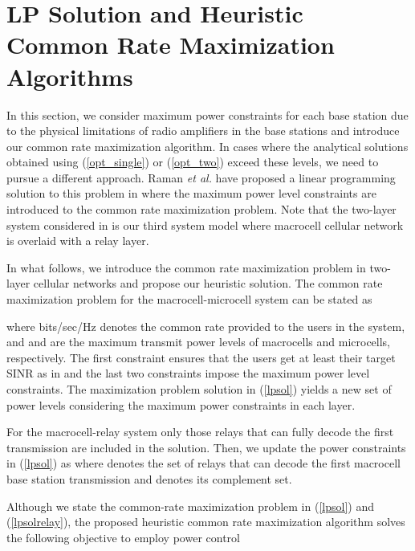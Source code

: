 \documentclass[conference,letterpaper,final,10pt]{IEEEtran}
\begin{document}
\section{LP Solution and Heuristic Common Rate Maximization Algorithms}\label{LPTitle}
In this section, we consider maximum power constraints for each base station due to the physical limitations of radio amplifiers in the base stations and introduce our common rate maximization algorithm. In cases where the analytical solutions obtained using (\ref{opt_single}) or (\ref{opt_two}) exceed these levels, we need to pursue a different approach. Raman \emph{et al.} have proposed a linear programming solution to this problem in \cite{RamanConf} where the maximum power level constraints are introduced to the common rate maximization problem. Note that the two-layer system considered in \cite{RamanConf} is our third system model where macrocell cellular network is overlaid with a relay layer.

In what follows, we introduce the common rate maximization problem in two-layer cellular networks and propose our heuristic solution. The common rate maximization problem for the macrocell-microcell system can be stated as

where  bits/sec/Hz denotes the common rate provided to the users in the system, and  and  are the maximum transmit power levels of macrocells and microcells, respectively. The first constraint ensures that the users get at least their target SINR as in \cite{RamanConf,Geometric} and the last two constraints impose the maximum power level constraints. The maximization problem solution in (\ref{lpsol}) yields a new set of power levels considering the maximum power constraints in each layer.

For the macrocell-relay system only those relays that can fully decode the first transmission are included in the solution. Then, we update the power constraints in (\ref{lpsol}) as 
where  denotes the set of relays that can decode the first macrocell base station transmission and  denotes its complement set.

Although we state the common-rate maximization problem in (\ref{lpsol}) and (\ref{lpsolrelay}), the proposed heuristic common rate maximization algorithm solves the following objective to employ power control
\end{document}
